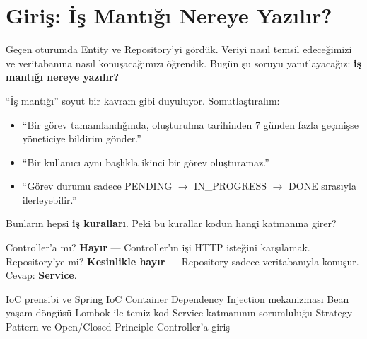 \documentclass[11pt,a4paper]{article}
\begin{document}
\newpage

\section{Giri\c{s}: \.{I}\c{s} Mant{\i}\u{g}{\i} Nereye Yaz{\i}l{\i}r?}

Ge\c{c}en oturumda Entity ve Repository'yi g\"{o}rd\"{u}k. Veriyi nas{\i}l temsil edece\u{g}imizi ve veritaban{\i}na nas{\i}l konu\c{s}aca\u{g}{\i}m{\i}z{\i} \"{o}\u{g}rendik. Bug\"{u}n \c{s}u soruyu yan{\i}tlayaca\u{g}{\i}z: \textbf{i\c{s} mant{\i}\u{g}{\i} nereye yaz{\i}l{\i}r?}

``\.{I}\c{s} mant{\i}\u{g}{\i}'' soyut bir kavram gibi duyuluyor. Somutla\c{s}t{\i}ral{\i}m:

\begin{itemize}
    \item ``Bir g\"{o}rev tamamland{\i}\u{g}{\i}nda, olu\c{s}turulma tarihinden 7 g\"{u}nden fazla ge\c{c}mi\c{s}se y\"{o}neticiye bildirim g\"{o}nder.''
    \item ``Bir kullan{\i}c{\i} ayn{\i} ba\c{s}l{\i}kla ikinci bir g\"{o}rev olu\c{s}turamaz.''
    \item ``G\"{o}rev durumu sadece PENDING $\rightarrow$ IN\_PROGRESS $\rightarrow$ DONE s{\i}ras{\i}yla ilerleyebilir.''
\end{itemize}

Bunlar{\i}n hepsi \textbf{i\c{s} kurallar{\i}}. Peki bu kurallar kodun hangi katman{\i}na girer?

Controller'a m{\i}? \textbf{Hay{\i}r} --- Controller'{\i}n i\c{s}i HTTP iste\u{g}ini kar\c{s}{\i}lamak. Repository'ye mi? \textbf{Kesinlikle hay{\i}r} --- Repository sadece veritaban{\i}yla konu\c{s}ur. Cevap: \textbf{Service}.

\begin{infobox}[title={\textbf{Bu Session'da \"{O}\u{g}renecekleriniz}}]
IoC prensibi ve Spring IoC Container \textbullet{} Dependency Injection mekanizmas{\i} \textbullet{} Bean ya\c{s}am d\"{o}ng\"{u}s\"{u} \textbullet{} Lombok ile temiz kod \textbullet{} Service katman{\i}n{\i}n sorumlulu\u{g}u \textbullet{} Strategy Pattern ve Open/Closed Principle \textbullet{} Controller'a giri\c{s}
\end{infobox}

\newpage

\end{document}
